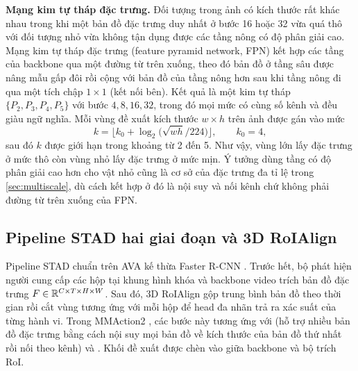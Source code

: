\textbf{Mạng kim tự tháp đặc trưng.} Đối tượng trong ảnh có kích thước rất khác nhau trong khi một bản đồ đặc trưng duy nhất ở bước 16 hoặc 32 vừa quá thô với đối tượng nhỏ vừa không tận dụng được các tầng nông có độ phân giải cao. Mạng kim tự tháp đặc trưng (feature pyramid network, FPN) \cite{lin2017fpn} kết hợp các tầng của backbone qua một đường từ trên xuống, theo đó bản đồ ở tầng sâu được nâng mẫu gấp đôi rồi cộng với bản đồ của tầng nông hơn sau khi tầng nông đi qua một tích chập $1 \times 1$ (kết nối bên). Kết quả là một kim tự tháp $\{P_2, P_3, P_4, P_5\}$ với bước $4, 8, 16, 32$, trong đó mọi mức có cùng số kênh và đều giàu ngữ nghĩa. Mỗi vùng đề xuất kích thước $w \times h$ trên ảnh được gán vào mức
\begin{equation}
k = \Big\lfloor k_0 + \log_2\big(\sqrt{wh}/224\big) \Big\rfloor, \qquad k_0 = 4,
\label{eq:fpn-level}
\end{equation}
sau đó $k$ được giới hạn trong khoảng từ 2 đến 5. Như vậy, vùng lớn lấy đặc trưng ở mức thô còn vùng nhỏ lấy đặc trưng ở mức mịn. Ý tưởng dùng tầng có độ phân giải cao hơn cho vật nhỏ cũng là cơ sở của đặc trưng đa tỉ lệ trong \cref{sec:multiscale}, dù cách kết hợp ở đó là nội suy và nối kênh chứ không phải đường từ trên xuống của FPN.

\subsection{Pipeline STAD hai giai đoạn và 3D RoIAlign}
\label{sec:twostage}

Pipeline STAD chuẩn trên AVA kế thừa Faster R-CNN \cite{ren2015fasterrcnn,gu2018ava}. Trước hết, bộ phát hiện người cung cấp các hộp tại khung hình khóa và backbone video trích bản đồ đặc trưng $F \in \mathbb{R}^{C \times T \times H \times W}$. Sau đó, 3D RoIAlign \cite{he2017maskrcnn,feichtenhofer2019slowfast} gộp trung bình bản đồ theo thời gian rồi cắt vùng tương ứng với mỗi hộp để head đa nhãn trả ra xác suất của từng hành vi. Trong MMAction2 \cite{mmaction2}, các bước này tương ứng với  (hỗ trợ nhiều bản đồ đặc trưng bằng cách nội suy mọi bản đồ về kích thước của bản đồ thứ nhất rồi nối theo kênh) và . Khối đề xuất được chèn vào giữa backbone và bộ trích RoI.

